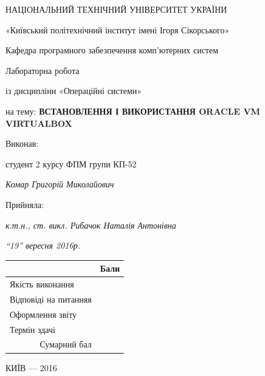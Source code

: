 \documentclass[12pt,a4paper]{article}
\begin{document}
\begin{titlepage}
	{\centering
	\Large НАЦІОНАЛЬНИЙ ТЕХНІЧНИЙ УНІВЕРСИТЕТ УКРАЇНИ\par
	\large «Київський політехнічний інститут імені Ігоря Сікорського»\par
	\vspace{1cm}
	Кафедра програмного забезпечення комп'ютерних систем\par
	\vspace{1cm}
	\normalsize Лабораторна робота \par
	із дисципліни «Операційні системи»\par
	\vspace{2cm}
	на тему: \textbf{ВСТАНОВЛЕННЯ І ВИКОРИСТАННЯ ORACLE VM VIRTUALBOX}}
	\vspace{1cm}
	\begin{flushright}
		Виконав:

		студент 2 курсу ФПМ групи КП-52

		\textit{Комар Григорій Миколайович}

		\vspace{1cm}

		Прийняла:

		\textit{к.т.н., ст. викл. Рибачок Наталія Антонівна}

		\textit{“19” вересня 2016р.}

		\vspace{1cm}
		\begin{tabular}{|l|l|}
			\hline
			&Бали\\ \hline
			Якість виконання&\\ \hline
			Відповіді на питанняя&\\ \hline
			Оформлення звіту&\\ \hline
			Термін здачі&\\ \hline
			\multicolumn{1}{|r|}{Сумарний бал}&\\ \hline
		\end{tabular}
	\end{flushright}
	\vfill
	\centering КИЇВ — 2016
\end{titlepage}
\end{document}
